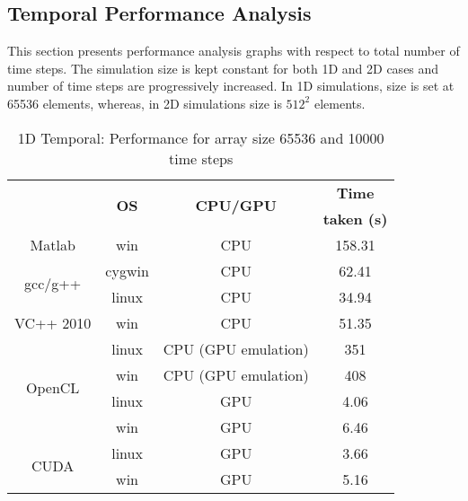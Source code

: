 \subsection{Temporal Performance Analysis}
This section presents performance analysis graphs with respect to total number of time steps. The simulation size is kept constant for both 1D and 2D cases and number of time steps are progressively increased. In 1D simulations, size is set at 65536 elements, whereas, in 2D simulations size is $512^2$ elements.
\begin{table}[H]
\begin{center}
\vspace{0.3cm}
\SingleSpacing
	\begin{tabular}{cccc}
	\hline \hline
		\rule{0pt}{2.6ex} & \multirow{2}{*}{\textbf{OS}} & \multirow{2}{*}{\textbf{CPU/GPU}}  & \textbf{Time}\\
		& &  & \textbf{taken (s)}\\
		\hline
		Matlab \rule{0pt}{2.6ex} & win & CPU &158.31\\
		\hline
		\multirow{2}{*}{gcc/g++} \rule{0pt}{2.6ex} & cygwin & CPU &62.41\\
		& linux & CPU &34.94\\
		\hline
		VC++ 2010 \rule{0pt}{2.6ex} & win & CPU &51.35\\
		\hline
		\multirow{4}{*}{OpenCL} \rule{0pt}{2.6ex} & linux & CPU (GPU emulation) &351\\
		& win & CPU (GPU emulation) &408\\
		& linux & GPU &4.06\\
		& win & GPU &6.46\\
		\hline
		\multirow{2}{*}{CUDA} \rule{0pt}{2.6ex} & linux & GPU &3.66\\
		& win & GPU &5.16\\
	\hline \hline
	\end{tabular}
\end{center}
\caption{1D Temporal: Performance for array size 65536 and 10000 time steps}
\label{Tab:Performance-1D-time-10000-steps}
\end{table}
